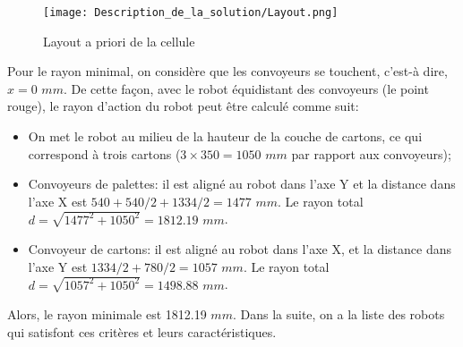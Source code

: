 \begin{figure}[H]
	\begin{center}	
		\texttt{[image: Description\_de\_la\_solution/Layout.png]}
		\caption{Layout a priori de la cellule}
		\label{fig:Layout}
	\end{center}
\end{figure}

Pour le rayon minimal, on considère que les convoyeurs se touchent, c’est-à dire, $x = 0$ $ mm $. De cette façon, avec le robot équidistant des convoyeurs (le point rouge), le rayon d’action du robot peut être calculé comme suit:
\begin{itemize}
\item On met le robot au milieu de la hauteur de la couche de cartons, ce qui correspond à trois cartons ($3 \times 350 = 1050$ $ mm $ par rapport aux convoyeurs);
\item Convoyeurs de palettes: il est aligné au robot dans l’axe Y et la distance dans l’axe X est $540 + 540/2 + 1334/2 = 1477$ $ mm $. Le rayon total $d=\sqrt{1477^2 + 1050^2} = 1812.19$ $ mm $.
\item Convoyeur de cartons: il est aligné au robot dans l’axe X, et la distance dans l’axe Y est $1334/2 + 780/2 = 1057$ $ mm $. Le rayon total $d = \sqrt{1057^2 + 1050^2} = 1498.88$ $ mm $.
\end{itemize}
Alors, le rayon minimale est 1812.19 $ mm $. Dans la suite, on a la liste des robots qui satisfont ces critères et leurs caractéristiques.


